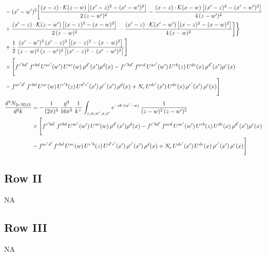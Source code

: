 \documentclass[9pt]{article}
\numberwithin{equation}{section}
\begin{document}
\begin{align}
&-(x^{\prime}-w^{\prime})^{2}\bigg[\frac{(x-z)\cdot\mathcal{K}(z-w)\,\big[(x^{\prime}-z)^{2}-(x^{\prime}-w^{\prime})^{2}\big]}{2\,(z-w^{\prime})^{2}}-\frac{(x-z)\cdot\mathcal{K}(x-w)\,\big[(x^{\prime}-z)^{2}-(x^{\prime}-w^{\prime})^{2}\big]}{4\,(z-w^{\prime})^{2}}\notag \\ & +\frac{(x^{\prime}-z)\cdot\mathcal{K}(z-w^{\prime})\,\big[(x-z)^{2}-(x-w)^{2}\big]}{2\,(z-w)^{2}}-\frac{(x^{\prime}-z)\cdot\mathcal{K}(x^{\prime}-w^{\prime})\,\big[(x-z)^{2}-(x-w)^{2}\big]}{4\,(z-w)^{2}}\bigg]\bigg\}\notag\\
&+\frac{1}{2}\,\frac{(x^{\prime}-w^{\prime})^{2}\,(x^{\prime}-z)^{2}\,\big[(x-z)^{2}-(x-w)^{2}\big]}{(z-w)^{2}\,(z-w^{\prime})^{2}\,\big[(x^{\prime}-z)^{2}-(x^{\prime}-w^{\prime})^{2}\big]}\Bigg]\notag\\
&\times\Bigg[f^{c^{\prime}bd^{\prime}}\,f^{cbd}\, U^{ac^{\prime}}(w^{\prime})\,U^{ac}(w)\,\rho^{d^{\prime}}(x^{\prime})\rho^{d}(x)- f^{c^{\prime}bd^{\prime}}\,f^{acd}\,U^{ac^{\prime}}(w^{\prime})\,U^{cb}(z)\,U^{de}(x)\,\rho^{d^{\prime}}(x^{\prime})\rho^{e}(x) \notag \\ & -f^{ac^{\prime}d^{\prime}}\,f^{cbd}\,U^{ac}(w)\,U^{c^{\prime}b}(z)\,U^{d^{\prime}e^{\prime}}(x^{\prime})\,\rho^{e^{\prime}}(x^{\prime})\,\rho^{d}(x) +N_{c}\,U^{de^{\prime}}(x^{\prime})\,U^{de}(x)\,\rho^{e^{\prime}}(x^{\prime})\,\rho^{e}(x)\Bigg]
\end{align}
\begin{align}
\frac{d^{3}N_{2e\,\rm NLO}}{d^{3}k}&= -\frac{1}{(2\pi)^{3}}\,\frac{g^{4}}{16\pi^{5}}\,\frac{1}{k^{+}}\int_{z,w,w^{\prime},x,x^{\prime}}e^{-ik\cdot(w^{\prime}-w)}\,\frac{1}{(z-w)^{2}\,(z-w^{\prime})^{2}}\notag\\
&\times\Bigg[f^{c^{\prime}bd^{\prime}}\,f^{cbd}\, U^{ac^{\prime}}(w^{\prime})\,U^{ac}(w)\,\rho^{d^{\prime}}(x^{\prime})\rho^{d}(x)- f^{c^{\prime}bd^{\prime}}\,f^{acd}\,U^{ac^{\prime}}(w^{\prime})\,U^{cb}(z)\,U^{de}(x)\,\rho^{d^{\prime}}(x^{\prime})\rho^{e}(x) \notag \\ & -f^{ac^{\prime}d^{\prime}}\,f^{cbd}\,U^{ac}(w)\,U^{c^{\prime}b}(z)\,U^{d^{\prime}e^{\prime}}(x^{\prime})\,\rho^{e^{\prime}}(x^{\prime})\,\rho^{d}(x) +N_{c}\,U^{de^{\prime}}(x^{\prime})\,U^{de}(x)\,\rho^{e^{\prime}}(x^{\prime})\,\rho^{e}(x)\Bigg]
\end{align}
\subsection{Row II}
\textsc{NA}
\subsection{Row III}
\textsc{NA}
\end{document}
